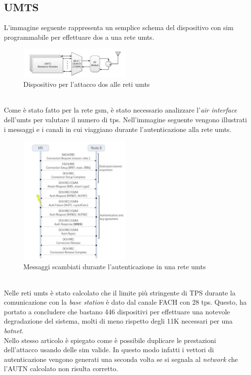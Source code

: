 \subsection{UMTS}
L'immagine seguente rappresenta un semplice schema del dispositivo con \gls{sim} programmabile per effettuare \gls{dos} a una rete \gls{umts}\cite{umts-dos}.
\begin{figure}[h]
    \centering
    \includegraphics[width=0.5\textwidth]{images/umts-dos-device.png}
    \caption{Dispositivo per l'attacco \gls{dos} alle reti \gls{umts}\cite{umts-dos}}
\end{figure}\\
Come è stato fatto per la rete \gls{gsm}, è stato necessario analizzare l'\textit{air interface} dell'\gls{umts} per valutare il numero di \gls{tps}.
Nell'immagine seguente vengono illustrati i messaggi e i canali in cui viaggiano durante l'autenticazione alla rete \gls{umts}.
\begin{figure}[h]
    \centering
    \includegraphics[width=0.5\textwidth]{images/umts-air-channel.png}
    \caption{Messaggi scambiati durante l'autenticazione in una rete \gls{umts}\cite{umts-dos}}
\end{figure}\\
Nelle reti \gls{umts} è stato calcolato che il limite più stringente di TPS durante la comunicazione con la \textit{base station} è dato dal canale FACH con 28 \gls{tps}.
Questo, ha portato a concludere che bastano 446 dispositivi per effettuare una notevole degradazione del sistema, molti di meno rispetto degli 11K necessari per una \textit{botnet}\cite{dos-imsi}.\\
Nello stesso articolo è spiegato come è possibile duplicare le prestazioni dell'attacco usando delle \gls{sim} valide. In questo modo infatti i vettori di autenticazione vengono generati una seconda volta se si segnala al
\textit{network} che l'AUTN calcolato non risulta corretto.
